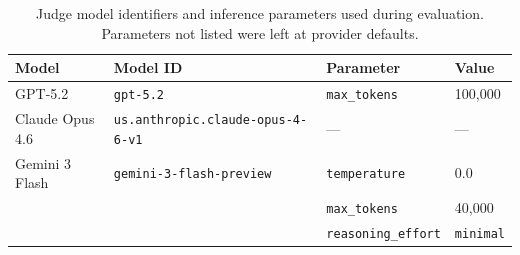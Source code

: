 \begin{table}[t]
\centering
\captionsetup{font=small}
\caption{Judge model identifiers and inference parameters used during
evaluation. Parameters not listed were left at provider defaults.}
\label{tab:judge-model-params}
\smallskip
\begin{tabular}{llll}
\toprule
\textbf{Model} & \textbf{Model ID} & \textbf{Parameter} & \textbf{Value} \\
\midrule
GPT-5.2
  & \texttt{gpt-5.2}
  & \texttt{max\_tokens}
  & 100{,}000 \\
\addlinespace
Claude Opus 4.6
  & \texttt{us.anthropic.claude-opus-4-6-v1}
  & ---
  & --- \\
\addlinespace
Gemini 3 Flash
  & \texttt{gemini-3-flash-preview}
  & \texttt{temperature}
  & 0.0 \\
  &
  & \texttt{max\_tokens}
  & 40{,}000 \\
  &
  & \texttt{reasoning\_effort}
  & \texttt{minimal} \\
\bottomrule
\end{tabular}
\end{table}